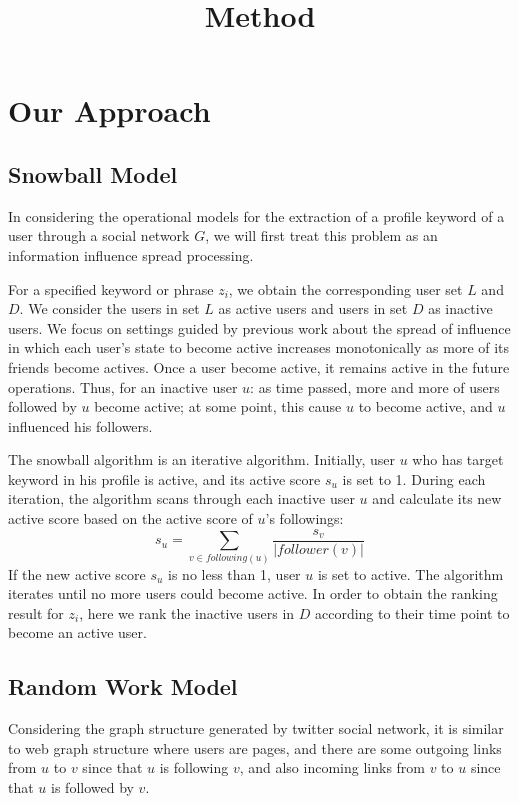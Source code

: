\documentclass{article}
\begin{document}
\title{Method}

\newcommand{\following}{\ensuremath{following}}
\newcommand{\follower}{\ensuremath{follower}}

\maketitle \else \fi

\section{Our Approach}\label{sec:method}

\subsection{Snowball Model}
In considering the operational models for the extraction of a profile keyword of a user through a social network $G$, we will first treat this problem as an information influence spread processing.

For a specified keyword or phrase $z_i$, we obtain the corresponding user set $L$ and $D$. We consider the users in set $L$ as active users and users in set $D$ as inactive users. We focus on settings guided by previous work about the spread of influence in which each user's state to become active increases monotonically as more of its friends become actives. Once a user become active, it remains active in the future operations. Thus, for an inactive user $u$: as time passed, more and more of users followed by $u$ become active; at some point, this cause $u$ to become active, and $u$ influenced his followers.

The snowball algorithm is an iterative algorithm. Initially, user $u$ who has target keyword in his profile is active, and its active score $s_u$ is set to 1. During each iteration, the algorithm scans through each inactive user $u$ and calculate its new active score based on the active score of $u$'s followings:
$$s_u = \sum_{v \in \following(u)} \frac{s_v}{|\follower(v)|}$$
If the new active score $s_u$ is no less than 1, user $u$ is set to active. The algorithm iterates until no more users could become active. In order to obtain the ranking result for $z_i$, here we rank the inactive users in $D$ according to their time point to become an active user.

\subsection{Random Work Model}
Considering the graph structure generated by twitter social network, it is similar to web graph structure where users are pages, and there are some outgoing links from $u$ to $v$ since that $u$ is following $v$, and also incoming links from $v$ to $u$ since that $u$ is followed by $v$.
\end{document}
